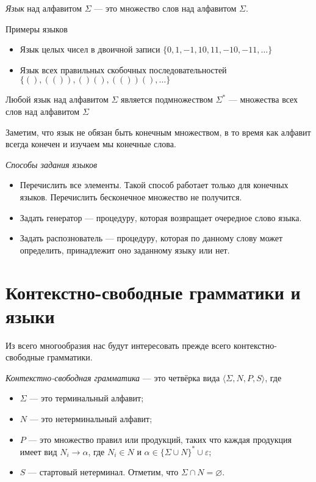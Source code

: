 \begin{definition}
\textit{Язык} над алфавитом $\Sigma$ --- это множество слов над алфавитом $\Sigma$.
\end{definition}

\begin{example}
  Примеры языков

  \begin{itemize}
    \item Язык целых чисел в двоичной записи $\{0, 1, -1, 10, 11, -10, -11, \dots\}$
    \item Язык всех правильных скобочных последовательностей $\{(), (()), ()(), (())(), \dots\}$
  \end{itemize}
\end{example}

Любой язык над алфавитом $\Sigma$ является подмножеством $\Sigma^*$ --- множества всех слов над алфавитом $\Sigma$

Заметим, что язык не обязан быть конечным множеством, в то время как алфавит всегда конечен и изучаем мы конечные слова.

\textit{Способы задания языков}
\begin{itemize}
\item Перечислить все элементы. Такой способ работает только для конечных языков. Перечислить бесконечное множество не получится.
\item Задать генератор --- процедуру, которая возвращает очередное слово языка.
\item Задать распознователь --- процедуру, которая по данному слову может определить, принадлежит оно заданному языку или нет.
\end{itemize}


\section{Контекстно-свободные грамматики и языки}\label{CFG}

Из всего многообразия нас будут интересовать прежде всего контекстно-свободные грамматики.

\begin{definition}
\textit{Контекстно-свободная грамматика} --- это четвёрка вида $\langle \Sigma, N, P, S \rangle$, где
\begin{itemize}
  \item $\Sigma$ --- это терминальный алфавит;
  \item $N$ --- это нетерминальный алфавит;
  \item $P$ --- это множество правил или продукций, таких что каждая продукция имеет вид $N_i \to \alpha$, где $N_i \in N$ и $\alpha \in \{\Sigma \cup N\}^* \cup {\varepsilon}$;
  \item $S$ --- стартовый нетерминал.
  Отметим, что $\Sigma \cap N = \varnothing$.
\end{itemize}
\end{definition}

